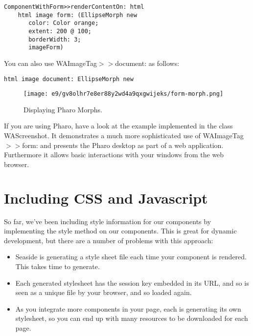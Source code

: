 \documentclass[a4paper,10pt,twoside]{book}
\newcommand{\ct}[1]{{\small\ttfamily\textup{#1}}}
\begin{document}
\begin{lstlisting}
ComponentWithForm>>renderContentOn: html
    html image form: (EllipseMorph new 
       color: Color orange;
       extent: 200 @ 100;
       borderWidth: 3;
       imageForm)
\end{lstlisting}

You can also use  \ct{WAImageTag$>$$>$document:} as follows:

\begin{lstlisting}
html image document: EllipseMorph new
\end{lstlisting}

\begin{figure}[h!tbp]
	\begin{center}
		\texttt{[image: e9/gv8olhr7e8er88y2wd4a9qxgwijeks/form-morph.png]}
		\caption{Displaying Pharo Morphs.\label{book:inaction:servingfiles:images:resourceformmorph}}
	\end{center}
\end{figure}


If you are using Pharo, have a look at the example implemented in the class  \ct{WAScreenshot}. It demonstrates a much more sophisticated use of  \ct{WAImageTag$>$$>$form:} and presents the Pharo desktop as part of a web application. Furthermore it allows basic interactions with your windows from the web browser.

\section{Including CSS and Javascript}
\label{book:inaction:servingfiles:cssandjs}

So far, we've been including style information for our components by implementing the \ct{style} method on our components. This is great for dynamic development, but there are a number of problems with this approach: 

\begin{itemize}
\item  Seaside is generating a style sheet file each time your component is rendered. This takes time to generate.
\item  Each generated stylesheet has the session key embedded in its URL, and so is seen as a unique file by your browser, and so loaded again.
\item  As you integrate more components in your page, each is generating its own stylesheet, so you can end up with many resources to be downloaded for each page.
\end{itemize}
\end{document}

